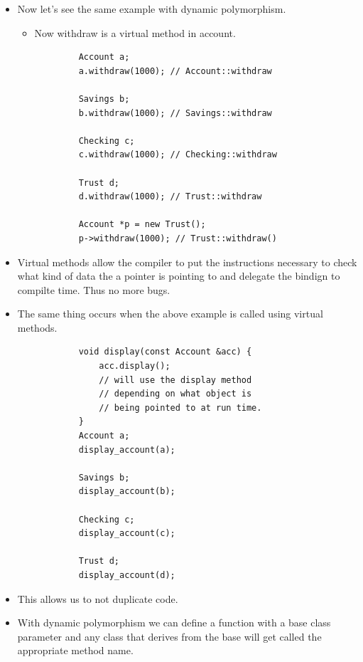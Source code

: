\begin{itemize}
    
    \item Now let's see the same example with dynamic polymorphism.
        \begin{itemize}
            \item Now withdraw is a virtual method in account.
        \end{itemize}
        \begin{verbatim}
            Account a;
            a.withdraw(1000); // Account::withdraw

            Savings b;
            b.withdraw(1000); // Savings::withdraw
            
            Checking c;
            c.withdraw(1000); // Checking::withdraw

            Trust d;
            d.withdraw(1000); // Trust::withdraw

            Account *p = new Trust();
            p->withdraw(1000); // Trust::withdraw()
        \end{verbatim}
    
    \item Virtual methods allow the compiler to put the instructions necessary to check what kind of data the a pointer is pointing to and delegate the bindign to compilte time. Thus no more bugs.
    \item The same thing occurs when the above example is called using virtual methods.
        \begin{verbatim}
            void display(const Account &acc) {
                acc.display();
                // will use the display method 
                // depending on what object is 
                // being pointed to at run time.
            }
            Account a;
            display_account(a);

            Savings b;
            display_account(b);

            Checking c;
            display_account(c);

            Trust d;
            display_account(d);
        \end{verbatim}
    
    \item This allows us to not duplicate code.
    \item With dynamic polymorphism we can define a function with a base class parameter and any class that derives from the base will get called the appropriate method name.
\end{itemize}

